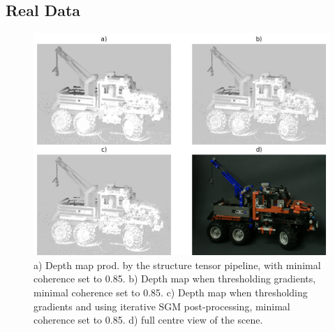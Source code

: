 \documentclass  [
  paper    = a4,
  BCOR     = 10mm,
  twoside,
  fontsize = 12pt,
  fleqn,
  toc      = bibnumbered,
  toc      = listofnumbered,
  numbers  = noendperiod,
  headings = normal,
  listof   = leveldown,
  version  = 3.03
]                                       {scrreprt}
\begin{document}
\begin{appendix}
\chapter{Real Data}
\label{sec:realdata_appendix}
\begin{figure}[h!]
	\centering
	\includegraphics[width=1\linewidth]{images/truck_realdata.png}
	\caption[Truck with iterative SGM]{a) Depth map prod. by the structure tensor pipeline, with minimal coherence set to 0.85. b) Depth map when thresholding gradients, minimal coherence set to 0.85. c) Depth map when thresholding gradients and using iterative SGM post-processing, minimal coherence set to 0.85.  d) full centre view of the scene.}
	\label{fig:truckrealdata}
\end{figure}

\end{appendix}
\end{document}
